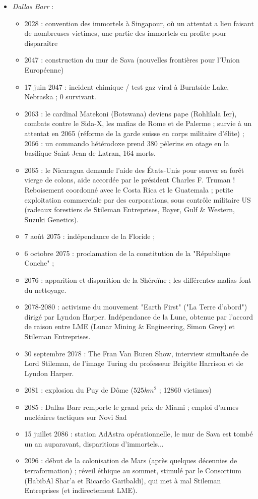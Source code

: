 \documentclass[11pt,twoside,a4paper]{article}
\begin{document}
\begin{multicols*}{2}
\begin{itemize}
	\item \emph{Dallas Barr} :
	\begin{itemize}
		\item 2028 : convention des immortels {\`a} Singapour, o{\`u} un attentat a lieu faisant de nombreuses victimes, une partie des immortels en profite pour dispara{\^i}tre
		\item 2047 : construction du mur de Sava (nouvelles fronti{\`e}res pour l'Union Europ{\'e}enne)
		\item 17 juin 2047 : incident chimique / test gaz viral {\`a} Burntside Lake, Nebraska ; 0 survivant.
		\item 2063 : le cardinal Matekoni (Botswana) deviens pape (Rohlilala Ier), combats contre le Sida-X, les mafias de Rome et de Palerme ; survie {\`a} un attentat en 2065 (r{\'e}forme de la garde suisse en corps militaire d'{\'e}lite) ; 2066 : un commando h{\'e}t{\'e}rodoxe prend 380 p{\`e}lerins en otage en la basilique Saint Jean de Latran, 164 morts.
		\item 2065 : le Nicaragua demande l'aide des {\'E}tats-Unis pour sauver sa for{\^e}t vierge de colons, aide accord{\'e}e par le pr{\'e}sident Charles F. Truman ! Reboisement coordonn{\'e} avec le Costa Rica et le Guatemala ; petite exploitation commerciale par des corporations, sous contr{\^o}le militaire US (radeaux forestiers de Stileman Entreprises, Bayer, Gulf \& Western, Suzuki Genetics).
		\item 7 ao{\^u}t 2075 : ind{\'e}pendance de la Floride ;
		\item 6 octobre 2075 : proclamation de la constitution de la "R{\'e}publique Conche" ; 
		\item 2076 : apparition et disparition de la Sh{\'e}ro{\"i}ne ; les diff{\'e}rentes mafias font du nettoyage. 
		\item 2078-2080 : activisme du mouvement "Earth First" ("La Terre d'abord") dirig{\'e} par Lyndon Harper. Ind{\'e}pendance de la Lune, obtenue par l'accord de raison entre LME (Lunar Mining \& Engineering, Simon Grey) et Stileman Entreprises.
		\item 30 septembre 2078 : The Fran Van Buren Show, interview simultan{\'e}e de Lord Stileman, de l'image Turing du professeur Brigitte Harrison et de Lyndon Harper.
		\item 2081 : explosion du Puy de D{\^o}me ($525km^{2}$ ; 12860 victimes)
		\item 2085 : Dallas Barr remporte le grand prix de Miami ; emploi d'armes nucl{\'e}aires tactiques sur Novi Sad
		\item 15 juillet 2086 : station AdAstra op{\'e}rationnelle, le mur de Sava est tomb{\'e} un an auparavant, disparitions d'immortels...
		\item 2096 : d{\'e}but de la colonisation de Mars (apr{\`e}s quelques d{\'e}cennies de terraformation) ; r{\'e}veil {\'e}thique au sommet, stimul{\'e} par le Consortium (HabibAl Shar'a et Ricardo Garibaldi), qui met {\`a} mal Stileman Entreprises (et indirectement LME).
	\end{itemize} %
	

\end{itemize}
\end{multicols*}
\end{document}
